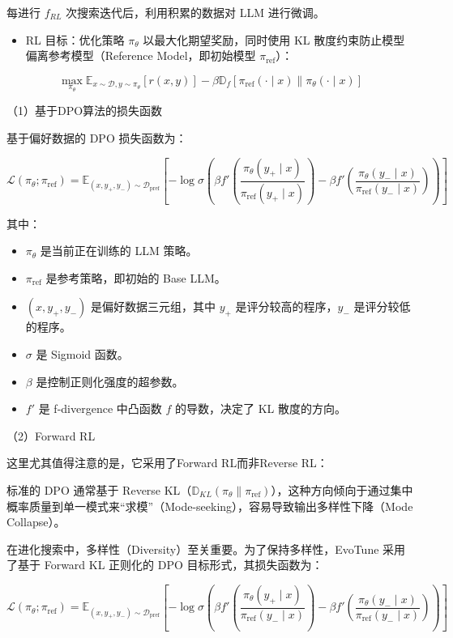 每进行 \(f_{RL}\) 次搜索迭代后，利用积累的数据对 LLM 进行微调。

\begin{itemize}
\tightlist
\item
  RL 目标：优化策略 \(\pi_\theta\) 以最大化期望奖励，同时使用 KL 散度约束防止模型偏离参考模型（Reference Model，即初始模型 \(\pi_{\mathrm{ref}}\)）：
\end{itemize}

\[
\max_{\pi_\theta}\mathbb{E}_{x \sim \mathcal{D}, y \sim \pi_\theta}[r(x,y)] - \beta \mathbb{D}_f\left[\pi_{\mathrm{ref}}(\cdot \mid x) \| \pi_\theta(\cdot \mid x)\right]
\]

（1）基于DPO算法的损失函数

基于偏好数据的 DPO 损失函数为：

\[
\mathcal{L}(\pi_\theta; \pi_{\mathrm{ref}}) =
\mathbb{E}_{(x,y_+,y_-) \sim \mathcal{D}_{\mathrm{pref}}}
\left[
-\log \sigma\left(
\beta f'\left(\frac{\pi_\theta(y_+ \mid x)}{\pi_{\mathrm{ref}}(y_+ \mid x)}\right)
- \beta f'\left(\frac{\pi_\theta(y_- \mid x)}{\pi_{\mathrm{ref}}(y_- \mid x)}\right)
\right)
\right]
\]

其中：

\begin{itemize}
\tightlist
\item
  \(\pi_\theta\) 是当前正在训练的 LLM 策略。
\item
  \(\pi_{\mathrm{ref}}\) 是参考策略，即初始的 Base LLM。
\item
  \((x,y_+,y_-)\) 是偏好数据三元组，其中 \(y_+\) 是评分较高的程序，\(y_-\) 是评分较低的程序。
\item
  \(\sigma\) 是 Sigmoid 函数。
\item
  \(\beta\) 是控制正则化强度的超参数。
\item
  \(f'\) 是 f-divergence 中凸函数 \(f\) 的导数，决定了 KL 散度的方向。
\end{itemize}

（2）Forward RL

这里尤其值得注意的是，它采用了Forward RL而非Reverse RL：

标准的 DPO 通常基于 Reverse KL（\(\mathbb{D}_{KL}(\pi_\theta \| \pi_{\mathrm{ref}})\)），这种方向倾向于通过集中概率质量到单一模式来``求模''（Mode-seeking），容易导致输出多样性下降（Mode Collapse）。

在进化搜索中，多样性（Diversity）至关重要。为了保持多样性，EvoTune 采用了基于 Forward KL 正则化的 DPO 目标形式，其损失函数为：

\[
\mathcal{L}(\pi_\theta; \pi_{\mathrm{ref}}) =
\mathbb{E}_{(x,y_+,y_-) \sim \mathcal{D}_{\mathrm{pref}}}
\left[
-\log \sigma\left(
\beta f'\left(\frac{\pi_\theta(y_+ \mid x)}{\pi_{\mathrm{ref}}(y_- \mid x)}\right)
- \beta f'\left(\frac{\pi_\theta(y_- \mid x)}{\pi_{\mathrm{ref}}(y_- \mid x)}\right)
\right)
\right]
\]

